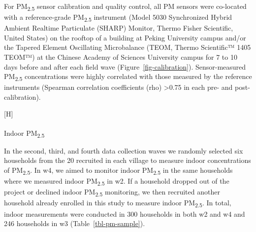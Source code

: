 \documentclass[
  letterpaper,
  DIV=11,
  numbers=noendperiod]{scrartcl}
\makeatletter
\let\oldparagraph\paragraph
\renewcommand{\paragraph}{ %
    \@ifstar %
      \xxxParagraphStar %
      \xxxParagraphNoStar %
  } %
\newcommand{\xxxParagraphStar}[1]{\oldparagraph*{#1}\mbox{}} %
\newcommand{\xxxParagraphNoStar}[1]{\oldparagraph{#1}\mbox{}} %
\renewenvironment{figure}%
   {\renewcommand\familydefault\sfdefault
    \@float{figure}}
   {\end@float}
\providecommand{\DIFaddbegin}{} %
\providecommand{\DIFaddend}{} %
\providecommand{\DIFdelbegin}{} %
\providecommand{\DIFdelend}{} %
\providecommand{\DIFaddbeginFL}{} %
\providecommand{\DIFaddendFL}{} %
\providecommand{\DIFdelbeginFL}{} %
\providecommand{\DIFdelendFL}{} %
\newcommand{\DIFscaledelfig}{0.5}
\newlength{\DIFdelgraphicswidth} %
\newlength{\DIFdelgraphicsheight} %
\newcommand{\DIFaddincludegraphics}[2][]{{\color{blue}\fbox{\DIFOincludegraphics[#1]{#2}}}} %
\newcommand{\DIFdelincludegraphics}[2][]{%
\sbox{\DIFdelgraphicsbox}{\DIFOincludegraphics[#1]{#2}}%
\settoboxwidth{\DIFdelgraphicswidth}{\DIFdelgraphicsbox} %
\settoboxtotalheight{\DIFdelgraphicsheight}{\DIFdelgraphicsbox} %
\scalebox{\DIFscaledelfig}{%
\parbox[b]{\DIFdelgraphicswidth}{\usebox{\DIFdelgraphicsbox}\\[-\baselineskip] \rule{\DIFdelgraphicswidth}{0em}}\llap{\resizebox{\DIFdelgraphicswidth}{\DIFdelgraphicsheight}{%
\setlength{\unitlength}{\DIFdelgraphicswidth}%
\begin{picture}(1,1)%
\thicklines\linethickness{2pt} %
{\color[rgb]{1,0,0}\put(0,0){\framebox(1,1){}}}%
{\color[rgb]{1,0,0}\put(0,0){\line( 1,1){1}}}%
{\color[rgb]{1,0,0}\put(0,1){\line(1,-1){1}}}%
\end{picture}%
}\hspace*{3pt}}} %
} %
\DeclareRobustCommand{\DIFaddbegin}{\DIFOaddbegin \let\includegraphics\DIFaddincludegraphics} %
\DeclareRobustCommand{\DIFaddend}{\DIFOaddend \let\includegraphics\DIFOincludegraphics} %
\DeclareRobustCommand{\DIFdelbegin}{\DIFOdelbegin \let\includegraphics\DIFdelincludegraphics} %
\DeclareRobustCommand{\DIFdelend}{\DIFOaddend \let\includegraphics\DIFOincludegraphics} %
\DeclareRobustCommand{\DIFaddbeginFL}{\DIFOaddbeginFL \let\includegraphics\DIFaddincludegraphics} %
\DeclareRobustCommand{\DIFaddendFL}{\DIFOaddendFL \let\includegraphics\DIFOincludegraphics} %
\DeclareRobustCommand{\DIFdelbeginFL}{\DIFOdelbeginFL \let\includegraphics\DIFdelincludegraphics} %
\DeclareRobustCommand{\DIFdelendFL}{\DIFOaddendFL \let\includegraphics\DIFOincludegraphics} %
\makeatother
\begin{document}
For PM\textsubscript{2.5} sensor calibration and quality control, all PM
sensors were co-located with a reference-grade PM\textsubscript{2.5}
instrument (Model 5030 Synchronized Hybrid Ambient Realtime Particulate
(SHARP) Monitor, Thermo Fisher Scientific, United States) on the rooftop
of a building at Peking University campus and/or the Tapered Element
Oscillating Microbalance (TEOM, Thermo Scientific™ 1405 TEOM™) at the
Chinese Academy of Sciences University campus for 7 to 10 days before
and after each field wave (Figure~\ref{fig-calibration}).
Sensor-measured PM\textsubscript{2.5} concentrations were highly
correlated with those measured by the reference instruments (Spearman
correlation coefficients (rho) \textgreater0.75 in each pre- and
post-calibration).

\begin{figure}[H]

\DIFdelbeginFL %
\DIFdelendFL \DIFaddbeginFL {}
\DIFaddendFL 

\DIFdelbeginFL %

\DIFdelendFL \caption{\label{fig-calibration}Calibration of real-time sensors against
a reference monitor at University of the Chinese Academy of Sciences.}

\end{figure}%

\DIFdelbegin %
\DIFdelend \DIFaddbegin \paragraph{\texorpdfstring{Indoor
PM\textsubscript{2.5}}{Indoor PM2.5}}\label{indoor-pm2.5}
\DIFaddend 

In the second, third, and fourth data collection waves we randomly
selected six households from the 20 recruited in each village to measure
indoor concentrations of PM\textsubscript{2.5}. In w4, we aimed to
monitor indoor PM\textsubscript{2.5} in the same households where we
measured indoor PM\textsubscript{2.5} in w2. If a household dropped out
of the project or declined indoor PM\textsubscript{2.5} monitoring, we
then recruited another household already enrolled in this study to
measure indoor PM\textsubscript{2.5}. In total, indoor measurements were
conducted in 300 households in both w2 and w4 and 246 households in w3
(Table~\ref{tbl-pm-sample}).
\end{document}

